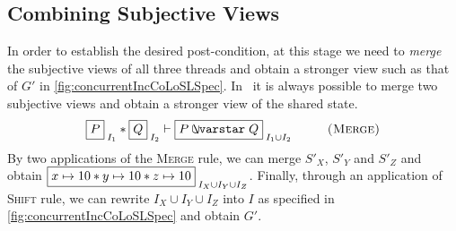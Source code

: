 \subsection{Combining Subjective Views}\label{subsec:merge}
In order to establish the desired post-condition, at this stage we need to \emph{merge} the subjective views of all three threads and obtain a stronger view such as that of $G'$ in \fig\ref{fig:concurrentIncCoLoSLSpec}. In \colosl\ it is always possible to merge two subjective views and obtain a stronger view of the shared state. 
%
\[
	\shared{P}{I_1} * \shared{Q}{I_2} \vdash \shared{P \sepish Q}{I_1 \cup I_2} \hspace*{1cm} \textsc{(Merge)}
\]
%
By two applications of the \textsc{Merge} rule, we can merge $S'_X$, $S'_Y$ and $S'_Z$ and obtain $\shared{\cell{x}{10} * \cell{y}{10} * \cell{z}{10}}{I_X \cup I_Y \cup I_Z}$. Finally, through an application of \textsc{Shift} rule, we can rewrite $I_X \cup I_Y \cup I_Z$ into $I$ as specified in \fig\ref{fig:concurrentIncCoLoSLSpec} and obtain $G'$.
